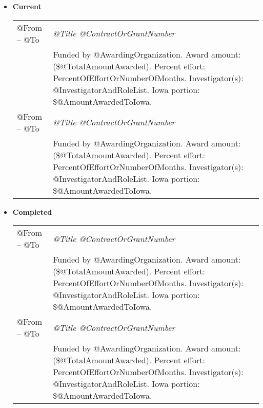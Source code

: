 \documentclass[10pt]{article}
\begin{document}
\begin{itemize}


\item[] \textbf{Current}
\\[1.3ex]
\begin{tabular}{l@{\quad\ }p{34em}} 
 @From -- @To 
 & \emph{@Title @ContractOrGrantNumber} \\
 & Funded by @AwardingOrganization. 
   Award amount: (\$@TotalAmountAwarded). 
   Percent effort: PercentOfEffortOrNumberOfMonths. 
   Investigator(s): @InvestigatorAndRoleList. 
   Iowa portion: \$@AmountAwardedToIowa.
   \smallskip \\
 @From -- @To 
 & \emph{@Title @ContractOrGrantNumber} \\
 & Funded by @AwardingOrganization. 
   Award amount: (\$@TotalAmountAwarded). 
   Percent effort: PercentOfEffortOrNumberOfMonths. 
   Investigator(s): @InvestigatorAndRoleList. 
   Iowa portion: \$@AmountAwardedToIowa.
\end{tabular}

\item[] \textbf{Completed}
\\[1.3ex]
\begin{tabular}{l@{\quad\ }p{34em}} 
 @From -- @To 
 & \emph{@Title @ContractOrGrantNumber} \\
 & Funded by @AwardingOrganization. 
   Award amount: (\$@TotalAmountAwarded). 
   Percent effort: PercentOfEffortOrNumberOfMonths. 
   Investigator(s): @InvestigatorAndRoleList. 
   Iowa portion: \$@AmountAwardedToIowa.
   \smallskip \\
 @From -- @To 
 & \emph{@Title @ContractOrGrantNumber} \\
 & Funded by @AwardingOrganization. 
   Award amount: (\$@TotalAmountAwarded). 
   Percent effort: PercentOfEffortOrNumberOfMonths. 
   Investigator(s): @InvestigatorAndRoleList. 
   Iowa portion: \$@AmountAwardedToIowa.
\end{tabular}


\end{itemize}
\end{document}
